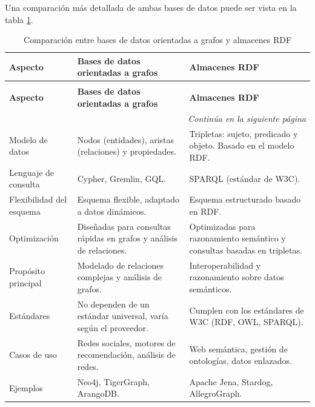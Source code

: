 Una comparación más detallada de ambas bases de datos puede ser vista en la tabla \ref{tab:graph-db-comparison-table}.

    \begin{longtable}{|p{3cm}|p{5cm}|p{5cm}|}
        \hline
        \textbf{Aspecto} & \textbf{Bases de datos orientadas a grafos} & \textbf{Almacenes RDF} \\
        \hline
        \endfirsthead
        \caption{Comparación entre bases de datos orientadas a grafos y almacenes RDF}\label{tab:graph-db-comparison-table}\\
        

        \hline
        \textbf{Aspecto} & \textbf{Bases de datos orientadas a grafos} & \textbf{Almacenes RDF} \\
        \hline
        \endhead

        
        \hline
        \multicolumn{3}{|r|}{\textit{Continúa en la siguiente página}} \\
        \hline
        \endfoot
        
        \hline
        \endlastfoot

        
        Modelo de datos & Nodos (entidades), aristas (relaciones) y propiedades. & Tripletas: sujeto, predicado y objeto. Basado en el modelo RDF. \\
        \hline
        Lenguaje de consulta & Cypher, Gremlin, GQL. & SPARQL (estándar de W3C). \\
        \hline
        Flexibilidad del esquema & Esquema flexible, adaptado a datos dinámicos. & Esquema estructurado basado en RDF. \\
        \hline
        Optimización & Diseñadas para consultas rápidas en grafos y análisis de relaciones. & Optimizadas para razonamiento semántico y consultas basadas en tripletas. \\
        \hline
        Propósito principal & Modelado de relaciones complejas y análisis de grafos. & Interoperabilidad y razonamiento sobre datos semánticos. \\
        \hline
        Estándares & No dependen de un estándar universal, varía según el proveedor. & Cumplen con los estándares de W3C (RDF, OWL, SPARQL). \\
        \hline
        Casos de uso & Redes sociales, motores de recomendación, análisis de redes. & Web semántica, gestión de ontologías, datos enlazados. \\
        \hline
        Ejemplos & Neo4j, TigerGraph, ArangoDB. & Apache Jena, Stardog, AllegroGraph. \\
        \hline
    
        \end{longtable}




